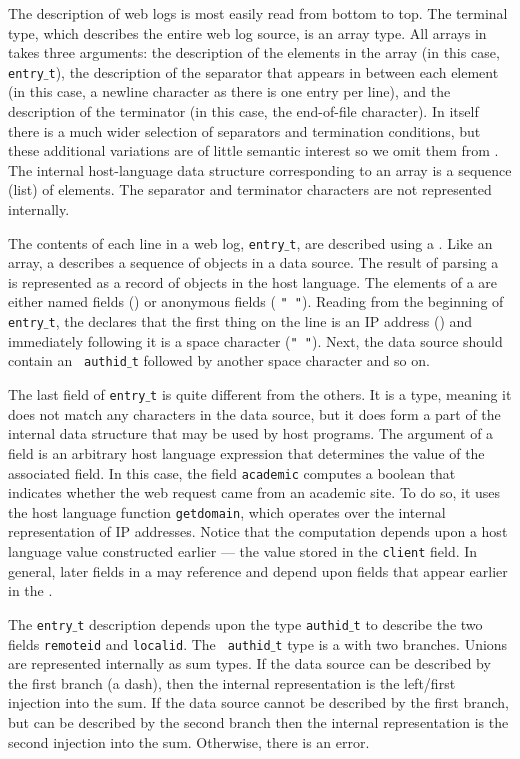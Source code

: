 The \ipads{} description of web logs is most easily read from bottom to top.
The terminal type, which describes the entire web log source, is an array type.
All arrays in \ipads{} takes three arguments: the description
of the elements in the array (in this case, {\tt entry$\_$t}),
the description of the separator that appears in between each element
(in this case, a newline character \Peor{} as there is one entry per line), and 
the description of the terminator (in this case, the end-of-file character).
In \pads{} itself there is a much wider selection of separators and
termination conditions, but these additional variations are of little semantic 
interest so we omit them from \ipads.  
The internal host-language data structure corresponding to
an array is a sequence (list) of elements.
The separator and terminator characters are not 
represented internally.

The contents of each line in a web log, 
{\tt entry$\_$t}, are described using a
\Pstruct.  Like an array, a \Pstruct{} describes a sequence of 
objects in a data source.  The result of parsing a \Pstruct{} is
represented as a record of objects in the host language.  The elements
of a \Pstruct{} are either named fields () or
anonymous fields (\eg{} {\tt " "}).  Reading from the beginning of {\tt
entry$\_$t}, the \Pstruct{} declares that the first thing on the line
is an IP address (\Pip) and immediately following it is a space
character ({\tt " "}).  Next, the data source should contain an {\tt
authid$\_$t} followed by another space character and so on.

The last field of {\tt entry$\_$t} is quite different from the others.
It is a \Pcompute{} type, meaning it does not match any characters in
the data source, but it does form a part of the internal data structure
that may be used by host programs.  The argument of a \Pcompute{}
field is an arbitrary host language expression that determines the value of the associated field.  In this case, the
field {\tt academic} computes a boolean that indicates whether 
the web request came from an academic site.  To do so, it uses the
host language function {\tt getdomain}, which operates over the
internal representation of IP addresses.  Notice that the computation
depends upon a host language value constructed earlier --- the value
stored in the {\tt client} field.  In general, later fields in a \Pstruct{} may
reference and depend upon fields that appear earlier in the \Pstruct{}.

The {\tt entry$\_$t} description depends upon the type {\tt authid$\_$t} to
describe the two fields {\tt remoteid} and {\tt localid}.  The {\tt
authid$\_$t} type is a \Punion{} with two branches.  Unions are
represented internally as sum types.  If the data source can be
described by the first branch (a dash), then the internal
representation is the left/first injection into the sum.  If the data
source cannot be described by the first branch, but can be described
by the second branch then the internal representation is the second
injection into the sum.  Otherwise, there is an error.

